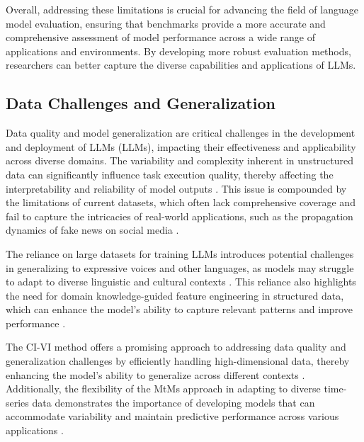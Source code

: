 Overall, addressing these limitations is crucial for advancing the field of language model evaluation, ensuring that benchmarks provide a more accurate and comprehensive assessment of model performance across a wide range of applications and environments. By developing more robust evaluation methods, researchers can better capture the diverse capabilities and applications of LLMs.



\subsection{Data Challenges and Generalization} \label{subsec:Data Challenges and Generalization}



Data quality and model generalization are critical challenges in the development and deployment of LLMs (LLMs), impacting their effectiveness and applicability across diverse domains. The variability and complexity inherent in unstructured data can significantly influence task execution quality, thereby affecting the interpretability and reliability of model outputs \cite{zhou2024languageconditionedimitationlearningbase}. This issue is compounded by the limitations of current datasets, which often lack comprehensive coverage and fail to capture the intricacies of real-world applications, such as the propagation dynamics of fake news on social media \cite{shu2017fakenewsdetectionsocial}.



The reliance on large datasets for training LLMs introduces potential challenges in generalizing to expressive voices and other languages, as models may struggle to adapt to diverse linguistic and cultural contexts \cite{tan2022naturalspeechendtoendtextspeech}. This reliance also highlights the need for domain knowledge-guided feature engineering in structured data, which can enhance the model's ability to capture relevant patterns and improve performance \cite{koo2023comprehensivesurveygenerativediffusion}.



The CI-VI method offers a promising approach to addressing data quality and generalization challenges by efficiently handling high-dimensional data, thereby enhancing the model's ability to generalize across different contexts \cite{moens2021efficientsemiimplicitvariationalinference}. Additionally, the flexibility of the MtMs approach in adapting to diverse time-series data demonstrates the importance of developing models that can accommodate variability and maintain predictive performance across various applications \cite{stank2024designingtimeseriesmodelshypernetworks}.



